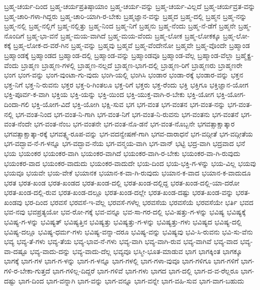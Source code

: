 {ಬ್ರಹ್ಮ-ಚರ್ಯ-ದಿಂದ
ಬ್ರಹ್ಮ-ಚರ್ಯಪ್ರತಿಷ್ಠಾಯಾಂ
ಬ್ರಹ್ಮ-ಚರ್ಯ-ವನ್ನು
ಬ್ರಹ್ಮ-ಚರ್ಯ-ವಿಲ್ಲದೆ
ಬ್ರಹ್ಮ-ಚರ್ಯವ್ರತ-ವನ್ನು
ಬ್ರಹ್ಮ-ಚಾರಿ-ಗಳಾ-ಗಿದ್ದರು
ಬ್ರಹ್ಮ-ಚಾರಿ-ಯಾಗಿ-ರ-ಬೇಕು
ಬ್ರಹ್ಮಜ್ಞಾನ-ವನ್ನು
ಬ್ರಹ್ಮದ
ಬ್ರಹ್ಮ-ದಲ್ಲಿ
ಬ್ರಹ್ಮನ
ಬ್ರಹ್ಮ-ನನ್ನು
ಬ್ರಹ್ಮ-ನಲ್ಲಿ
ಬ್ರಹ್ಮ-ನಲ್ಲಿಗೆ
ಬ್ರಹ್ಮ-ನಲ್ಲಿತ್ತು
ಬ್ರಹ್ಮ-ನಿಂದ
ಬ್ರಹ್ಮ-ನಿಗೆ
ಬ್ರಹ್ಮನು
ಬ್ರಹ್ಮ-ನೆಂದು
ಬ್ರಹ್ಮ-ನೆ-ಡೆಗೆ
ಬ್ರಹ್ಮನೇ
ಬ್ರಹ್ಮ-ನೊಂದಿಗೆ
ಬ್ರಹ್ಮ-ಭಾ-ವನೆ
ಬ್ರಹ್ಮ-ಮಯ-ವಾಗಿದೆ
ಬ್ರಹ್ಮ-ಮಯ-ವೆಂದು
ಬ್ರಹ್ಮ-ಲೋಕ
ಬ್ರಹ್ಮ-ಲೋಕಕ್ಕೂ
ಬ್ರಹ್ಮ-ಲೋ-ಕಕ್ಕೆ
ಬ್ರಹ್ಮ-ಲೋಕ-ದ-ವರೆ-ಗಿನ
ಬ್ರಹ್ಮ-ವನ್ನು
ಬ್ರಹ್ಮವು
ಬ್ರಹ್ಮವೆ
ಬ್ರಹ್ಮ-ವೆಂದೇನೋ
ಬ್ರಹ್ಮವೇ
ಬ್ರಹ್ಮ-ವೊಂದೇ
ಬ್ರಹ್ಮಾಂಡ
ಬ್ರಹ್ಮಾಂಡಕ್ಕೆ
ಬ್ರಹ್ಮಾಂಡದ
ಬ್ರಹ್ಮಾಂಡ-ದಲ್ಲಿ
ಬ್ರಹ್ಮಾಂಡ-ವನ್ನು
ಬ್ರಹ್ಮಾಂಡವೂ
ಬ್ರಹ್ಮಾಂಡ-ವೆಲ್ಲ
ಬ್ರಹ್ಮಾಂಡ-ವೆಲ್ಲಾ
ಬ್ರಹ್ಮೈಕ್ಯ-ವೆಂದು
ಬ್ರಾಹ್ಮಣ
ಬ್ರಾಹ್ಮಣ-ಗಳಲ್ಲಿ
ಬ್ರಾಹ್ಮಣ-ನಲ್ಲದೆ
ಬ್ರಾಹ್ಮಣ-ಭಾಗ-ದಲ್ಲಿ
ಬ್ರಾಹ್ಮಣ-ರಿಗೆ
ಬ್ರಾಹ್ಮಣರು
ಬ್ರಾಹ್ಮಣರೇ
ಭಂಗ
ಭಂಗ-ವನ್ನು
ಭಂಗ-ವುಂಟಾ-ಗು-ವುದು
ಭಂಗಿ-ಯಲ್ಲಿ
ಭಂಗಿಸಿ
ಭಂಡಾರ
ಭಂಡಾ-ರಕ್ಕೆ
ಭಂಡಾರ-ವನ್ನು
ಭಕ್ತನ
ಭಕ್ತ-ನಿಗೆ
ಭಕ್ತ-ನಿ-ರುವನು
ಭಕ್ತರ
ಭಕ್ತ-ರಿ-ಗಿಂತಲೂ
ಭಕ್ತ-ರಿಗೆ
ಭಕ್ತರು
ಭಕ್ತ-ರೆಂದು
ಭಕ್ತಿ
ಭಕ್ತಿಗೂ
ಭಕ್ತಿಜ್ಞಾನ-ಯೋಗ
ಭಕ್ತಿ-ಪೂರ್ವ-ಕ-ವಾಗಿ
ಭಕ್ತಿಯ
ಭಕ್ತಿ-ಯನ್ನು
ಭಕ್ತಿ-ಯಿಂದ
ಭಕ್ತಿ-ಯುಕ್ತ-ವಾಗಿ-ರ-ಬೇಕು
ಭಕ್ತಿ-ಯೋಗ
ಭಕ್ತಿ-ಯೋಗ-ದಿಂದಾ-ಗಲಿ
ಭಕ್ತಿ-ಯೋಗ-ವಿದೆ
ಭಕ್ತಿ-ಯೋಗಿ
ಭಕ್ಷಿ-ಸುವ
ಭಗ
ಭಗ-ವಂತ
ಭಗ-ವಂತನ
ಭಗ-ವಂತ-ನನ್ನು
ಭಗ-ವಂತ-ನಲ್ಲಿ
ಭಗ-ವಂತ-ನಿಂದ
ಭಗ-ವಂತ-ನಿ-ಗಾಗಿ
ಭಗ-ವಂತ-ನಿಗೆ
ಭಗ-ವಂತ-ನಿ-ರುವನು
ಭಗ-ವಂತನು
ಭಗ-ವಂತನೆ
ಭಗ-ವಂತ-ನೆಂದೇ
ಭಗ-ವಂತ-ನೆಂಬ
ಭಗ-ವಂತನೇ
ಭಗ-ವಂತ-ನೊ-ಡನೆ
ಭಗ-ವಂತ-ನೊಬ್ಬನೇ
ಭಗವತ್ಸಾಕ್ಷಾತ್ಕಾರ
ಭಗವತ್ಸಾಕ್ಷಾತ್ಕಾ-ರಕ್ಕೆ
ಭಗವತ್ಸ್ವ-ರೂಪ-ವನ್ನು
ಭಗ-ವದನ್ವೇಷಣೆ-ಗಾಗಿ
ಭಗವ-ದಾರಾಧನೆ
ಭಗ-ವದ್ಗೀತೆ
ಭಗ-ವದ್ಗೀತೆಯ
ಭಗ-ವದ್ಭಾವ-ನೆ-ಗ-ಳನ್ನೂ
ಭಗ-ವದ್ಭಾವ-ನೆಯ
ಭಗ-ವನ್ಮಯ-ವಾಗಿ
ಭಗ-ವಾನ್
ಭಟ್ಟಿ
ಭದ್ರ-ವಾಗಿ
ಭದ್ರವಾದ
ಭನೆ
ಭಯ
ಭಯಂಕರ
ಭಯಂಕರ-ವಾಗಿ
ಭಯಂಕರ-ವಾಗಿದೆ
ಭಯಂಕರ-ವಾಗಿ-ರ-ಬೇಕು
ಭಯಂಕರ-ವಾ-ಗಿ-ರುವುದು
ಭಯಂಕರ-ವಾದ
ಭಯಂಕರ-ವಾದುದು
ಭಯಂಕರ-ವಾದುದೇ
ಭಯ-ದಿಂದ
ಭಯ-ಭಕ್ತಿ-ಗ-ಳನ್ನು
ಭಯ-ವಿಲ್ಲ
ಭಯವು
ಭಯವೂ
ಭಯವೇ
ಭಯ-ವೇಕೆ
ಭಯಾನಕ
ಭಯಾನ-ಕ-ವಾ-ಗಿ-ರುವುದು
ಭಯಾನ-ಕ-ವಾದ
ಭಯಾನ-ಕ-ವಾದುದೂ
ಭರತ
ಭರತ-ಖಂಡ
ಭರತ-ಖಂಡದ
ಭರತ-ಖಂಡ-ದಲ್ಲಿ
ಭರತ-ಖಂಡ-ದಲ್ಲಿದ್ದ
ಭರತ-ಖಂಡ-ದಲ್ಲಿ-ಯಾ-ದರೋ
ಭರತ-ಖಂಡ-ದಲ್ಲಿ-ರುವ
ಭರತ-ಖಂಡ-ದಲ್ಲೂ
ಭರತ-ಖಂಡ-ದಲ್ಲೇ
ಭರತ-ಖಂಡ-ದಷ್ಟು
ಭರತ-ಖಂಡ-ವನ್ನು
ಭರತ-ಖಂಡವು
ಭರ-ದಿಂದ
ಭರವಸೆ
ಭರವಸೆ-ಇ-ವೆಲ್ಲ
ಭರವಸೆ-ಗಳೆಲ್ಲ
ಭರವಸೆಯ
ಭರವಸೆಯೆ
ಭರವಸೆಯೇ
ಭರ್ತಿ
ಭವದ
ಭವ-ನವು
ಭವಪ್ರತ್ಯಯೋ
ಭವ-ರೋ-ಗಕ್ಕೆ
ಭವ-ವನ್ನೂ
ಭವ-ಸಾ-ಗರ-ದಲ್ಲಿ
ಭವಿ-ಷತ್ತು-ಗ-ಳನ್ನು
ಭವಿಷ್ಯ
ಭವಿಷ್ಯಕ್ಕೆ
ಭವಿಷ್ಯ-ಗ-ಳನ್ನು
ಭವಿಷ್ಯತ್
ಭವಿಷ್ಯತ್ತಿನ
ಭವಿಷ್ಯತ್ತು
ಭವಿಷ್ಯತ್ತು-ಗ-ಳನ್ನು
ಭವಿಷ್ಯತ್ತು-ಗಳು
ಭವಿಷ್ಯದ
ಭವಿಷ್ಯ-ದಲ್ಲಿ
ಭವಿಷ್ಯ-ದಲ್ಲೂ
ಭವಿಷ್ಯ-ಧರ್ಮ-ಗಳು
ಭವಿಷ್ಯ-ವನ್ನಾ-ದರೂ
ಭವಿಷ್ಯ-ವನ್ನು
ಭವಿಷ್ಯವು
ಭವಿ-ಸಿ-ರುವನು
ಭವಿ-ಸು-ವೆನು
ಭವ್ಯ
ಭವ್ಯ-ತೆ-ಗಳು
ಭವ್ಯ-ತೆಯ
ಭವ್ಯ-ಭಾವ-ನೆ-ಗಳು
ಭವ್ಯ-ವಾಗಿ
ಭವ್ಯ-ವಾಗಿ-ರುವ
ಭವ್ಯ-ವಾಗಿವೆ
ಭವ್ಯ-ವಾದ
ಭವ್ಯ-ವಾ-ದಷ್ಟೂ
ಭವ್ಯ-ವಾದು-ದನ್ನು
ಭವ್ಯ-ವಾದು-ದೆಲ್ಲ
ಭವ್ಯವೂ
ಭಸ್ಮೀ-ಭೂತ-ಮಾಡುವ
ಭಾಗ
ಭಾಗಕ್ಕಿಂತ
ಭಾಗಕ್ಕೂ
ಭಾಗಕ್ಕೆ
ಭಾಗ-ಗಳ
ಭಾಗ-ಗ-ಳನ್ನು
ಭಾಗ-ಗ-ಳನ್ನೂ
ಭಾಗ-ಗಳಲ್ಲಿ
ಭಾಗ-ಗಳಾ-ವುವೂ
ಭಾಗ-ಗಳಿಗೂ
ಭಾಗ-ಗಳಿಗೆ
ಭಾಗ-ಗಳಿ-ರ-ಬೇಕಾ-ಗುತ್ತದೆ
ಭಾಗ-ಗಳಿಲ್ಲ-ದಿದ್ದರೆ
ಭಾಗ-ಗಳಿವೆ
ಭಾಗ-ಗಳು
ಭಾಗದ
ಭಾಗ-ದಲ್ಲಿ
ಭಾಗ-ದ-ವ-ರೆಲ್ಲರೂ
ಭಾಗ-ದಷ್ಟು
ಭಾಗ-ದಿಂದ
ಭಾಗ-ವನ್ನಾಗಿ
ಭಾಗ-ವನ್ನು
ಭಾಗ-ವನ್ನೂ
ಭಾಗ-ವನ್ನೇ
ಭಾಗ-ವಹಿ-ಸುವ
ಭಾಗ-ವಾಗ-ಬಹುದು
}

